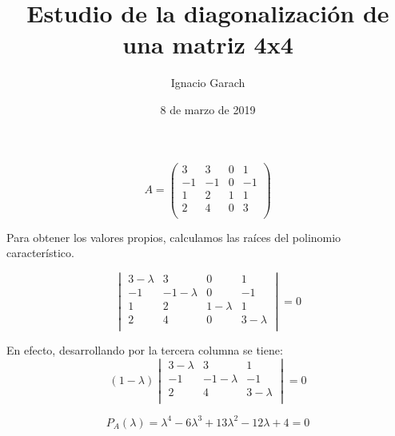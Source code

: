 \documentclass[a4paper,10pt]{article}
\title{Estudio de la diagonalización de una matriz 4x4}
\author{Ignacio Garach}
\date{8 de marzo de 2019}
\begin{document}
\maketitle



$$
A=\begin{pmatrix}
3&3&0&1\\
-1&-1&0&-1\\
1&2&1&1\\
2&4&0&3\\
\end{pmatrix}
$$

Para obtener los valores propios, calculamos las raíces del polinomio característico.

$$
\begin{vmatrix}
3-\lambda &3&0&1 \\
-1&-1-\lambda &0&-1 \\
1&2&1-\lambda &1 \\
2&4&0&3-\lambda \\
\end{vmatrix}=0
$$

En efecto, desarrollando por la tercera columna se tiene:
$$
(1-\lambda)\begin{vmatrix}
3-\lambda &3&1\\
-1&-1-\lambda &-1\\
2&4&3-\lambda\\
\end{vmatrix}=0
$$

$$
P_A(\lambda)=\lambda^4-6\lambda^3+13\lambda^2-12\lambda+4=0
$$
\end{document}
